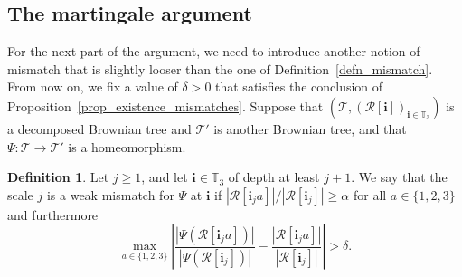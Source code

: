 \documentclass[11pt]{article}
\newcommand{\bsfrac}[2]{{#1}\big/{#2}}
\newcommand{\Tt}{\mathcal{T}}
\newcommand{\Rr}{\mathcal{R}}
\newcommand{\ii}{\mathbf{i}}
\theoremstyle{plain}
\theoremstyle{definition}
\newtheorem{definition}[theorem]{Definition}
\numberwithin{equation}{section}
\begin{document}
\subsection{The martingale argument}\label{subsec:martingale}
For the next part of the argument, we need to introduce another notion of mismatch that is slightly looser than the one of Definition~\ref{defn_mismatch}.
From now on, we fix a value of $\delta>0$ that satisfies the conclusion of Proposition~\ref{prop_existence_mismatches}.
Suppose that $\left( \Tt, \left( \Rr[\ii] \right)_{\ii \in \mathbb T_3} \right)$ is a decomposed Brownian tree and $\Tt'$ is another Brownian tree, and that $\Psi:\Tt\rightarrow \Tt'$ is a homeomorphism.
\begin{definition}\label{defn:weak_mismatch}
Let $j \geq 1$, and let $\ii \in \mathbb{T}_3$ of depth at least $j+1$. We say that the scale $j$ is a weak mismatch for $\Psi$ at $\ii$ if $\bsfrac{\left| \Rr[\ii_j a] \right|}{\left| \Rr[\ii_j] \right|}\geq \alpha$ for all $a \in \{1,2,3\}$ and furthermore\vspace*{-3pt}
\[ \max_{a\in \{1,2,3\}} \left| \frac{|\Psi(\Rr[\ii_j a])|}{|\Psi(\Rr[\ii_j])|} - \frac{|\Rr[\ii_j a]|}{|\Rr[\ii_j]|} \right| > \delta. \]
\end{definition}
\end{document}
